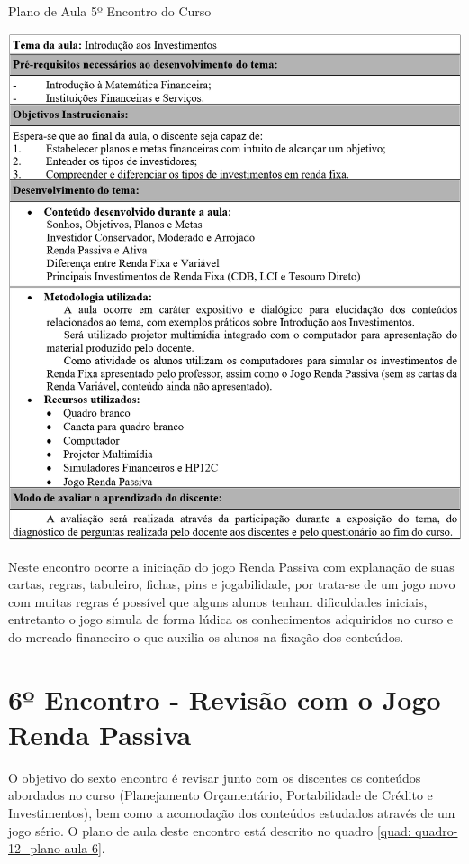 \graphicspath{{quadros/}} 
\begin{quadro}[!ht]
\centering
\begin{minipage}{1.\textwidth}
\caption{Plano de Aula 5º Encontro do Curso}
\centering
\includegraphics[width=1.0\textwidth]{quadro-11_plano-aula-5}
\label{quad: quadro-11_plano-aula-5}
\end{minipage}
\end{quadro}

Neste encontro ocorre a iniciação do jogo Renda Passiva com explanação de suas cartas, regras, tabuleiro, fichas, pins e jogabilidade, por trata-se de um jogo novo com muitas regras é possível que alguns alunos tenham dificuldades iniciais, entretanto o jogo simula de forma lúdica os conhecimentos adquiridos no curso e do mercado financeiro o que auxilia os alunos na fixação dos conteúdos.

\section{6º Encontro - Revisão com o Jogo Renda Passiva}
O objetivo do sexto encontro é revisar junto com os discentes os conteúdos abordados no curso (Planejamento Orçamentário, Portabilidade de Crédito e Investimentos), bem como a acomodação dos conteúdos estudados através de um jogo sério. O plano de aula deste encontro está descrito no quadro \ref{quad: quadro-12_plano-aula-6}.

